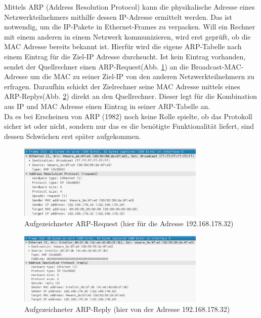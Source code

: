 Mittels ARP (Address Resolution Protocol) kann die physikalische Adresse eines Netzwerkteilnehmers mithilfe dessen IP-Adresse ermittelt werden. Das ist notwendig, um die IP-Pakete in Ethernet-Frames zu verpacken. Will ein Rechner mit einem anderen in einem Netzwerk kommunizieren, wird erst geprüft, ob die MAC Adresse bereits bekannt ist. Hierfür wird die eigene ARP-Tabelle nach einem Eintrag für die Ziel-IP Adresse durchsucht. Ist kein Eintrag vorhanden, sendet der Quellrechner einen ARP-Request(Abb. \ref{fig:arp_request_small}) an die Broadcast-MAC-Adresse um die MAC zu seiner Ziel-IP von den anderen Netzwerkteilnehmern zu erfragen. Daraufhin schickt der Zielrechner seine MAC Adresse mittels eines ARP-Replys(Abb. \ref{fig:arp_reply_small}) direkt an den Quellrechner. Dieser legt für die Kombination aus IP und MAC Adresse einen Eintrag in seiner ARP-Tabelle an. \\
Da es bei Erscheinen von ARP (1982) noch keine Rolle spielte, ob das Protokoll sicher ist oder nicht, sondern nur das es die benötigte Funktionalität liefert, sind dessen Schwächen erst später aufgekommen.\\
\begin{figure}[h!]
	\centering
		\includegraphics[width=0.80\textwidth]{bilder/arpSpoofing/arp_request_small.pdf}
	\caption{Aufgezeichneter ARP-Request (hier für die Adresse 192.168.178.32)}
	\label{fig:arp_request_small}
\end{figure}

\begin{figure}[h!]
	\centering
		\includegraphics[width=0.80\textwidth]{bilder/arpSpoofing/arp_reply_small.pdf}
	\caption{Aufgezeichneter ARP-Reply (hier von der Adresse 192.168.178.32)}
	\label{fig:arp_reply_small}
\end{figure}



